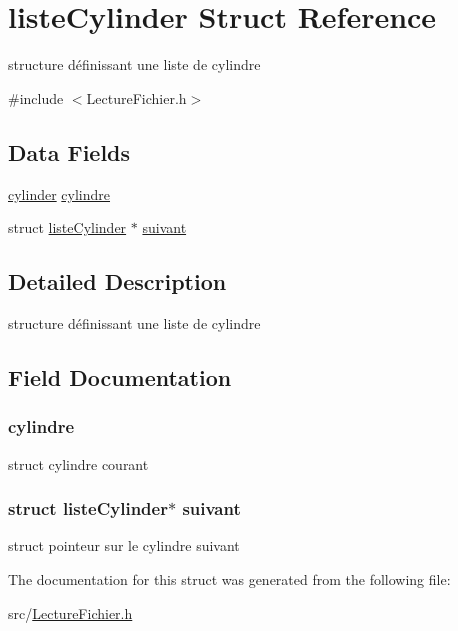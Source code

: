 \hypertarget{structliste_cylinder}{
\section{listeCylinder Struct Reference}
\label{structliste_cylinder}
}


structure définissant une liste de cylindre  




{\ttfamily \#include $<$LectureFichier.h$>$}

\subsection*{Data Fields}
\begin{DoxyCompactItemize}
\item 
\hyperlink{structcylinder}{cylinder} \hyperlink{structliste_cylinder_a2b77a6b43c1f234a112038b7ef842db5}{cylindre}
\item 
struct \hyperlink{structliste_cylinder}{listeCylinder} $\ast$ \hyperlink{structliste_cylinder_ac84661fb617ae44ff021eb8431840fb9}{suivant}
\end{DoxyCompactItemize}


\subsection{Detailed Description}
structure définissant une liste de cylindre 

\subsection{Field Documentation}
\hypertarget{structliste_cylinder_a2b77a6b43c1f234a112038b7ef842db5}{
\subsubsection[{cylindre}]{ {\bf cylindre}}}
\label{structliste_cylinder_a2b77a6b43c1f234a112038b7ef842db5}
struct cylindre courant \hypertarget{structliste_cylinder_ac84661fb617ae44ff021eb8431840fb9}{
\subsubsection[{suivant}]{\setlength{\rightskip}{0pt plus 5cm}struct {\bf listeCylinder}$\ast$ {\bf suivant}}}
\label{structliste_cylinder_ac84661fb617ae44ff021eb8431840fb9}
struct pointeur sur le cylindre suivant 

The documentation for this struct was generated from the following file:\begin{DoxyCompactItemize}
\item 
src/\hyperlink{_lecture_fichier_8h}{LectureFichier.h}\end{DoxyCompactItemize}
